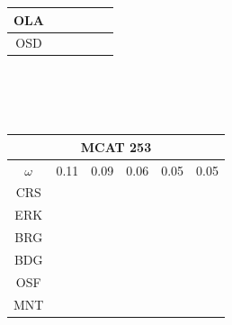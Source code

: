 \documentclass[12pt]{article}
\begin{document}
\begin{landscape}
\begin{figure}
{\begin{minipage}[c]{0.3\textwidth}
\begin{tabular}{|c|c|c|c|c|c|}
        OLA&\cellcolor[HTML]{984EA3}&\cellcolor[HTML]{4DAF4A}&\cellcolor[HTML]{984EA3}&\cellcolor[HTML]{984EA3}&\cellcolor[HTML]{984EA3}\\ \hline %
        OSD&\cellcolor[HTML]{FF7F00}&\cellcolor[HTML]{984EA3}&\cellcolor[HTML]{FF7F00}&\cellcolor[HTML]{FF7F00}&\cellcolor[HTML]{FF7F00}\\ \hline %
\end{tabular}\\$~$\\$~$\\
\hspace*{-5cm}
\begin{tabular}{|c|c|c|c|c|c|}%
         \hline \multicolumn{6}{|c|}{MCAT 253} \\ \hline
         $\omega$&0.11&0.09&0.06&0.05&0.05\\ \hline %
        CRS&\cellcolor[HTML]{E41A1C}&\cellcolor[HTML]{E41A1C}&\cellcolor[HTML]{E41A1C}&\cellcolor[HTML]{E41A1C}&\cellcolor[HTML]{E41A1C}\\ \hline %
        ERK&\cellcolor[HTML]{E41A1C}&\cellcolor[HTML]{E41A1C}&\cellcolor[HTML]{E41A1C}&\cellcolor[HTML]{377EB8}&\cellcolor[HTML]{E41A1C}\\ \hline %
        BRG&\cellcolor[HTML]{E41A1C}&\cellcolor[HTML]{377EB8}&\cellcolor[HTML]{E41A1C}&\cellcolor[HTML]{377EB8}&\cellcolor[HTML]{377EB8}\\ \hline %
        BDG&\cellcolor[HTML]{377EB8}&\cellcolor[HTML]{377EB8}&\cellcolor[HTML]{377EB8}&\cellcolor[HTML]{4DAF4A}&\cellcolor[HTML]{4DAF4A}\\ \hline %
        OSF&\cellcolor[HTML]{377EB8}&\cellcolor[HTML]{377EB8}&\cellcolor[HTML]{377EB8}&\cellcolor[HTML]{4DAF4A}&\cellcolor[HTML]{4DAF4A}\\ \hline %
        MNT&\cellcolor[HTML]{4DAF4A}&\cellcolor[HTML]{4DAF4A}&\cellcolor[HTML]{4DAF4A}&\cellcolor[HTML]{984EA3}&\cellcolor[HTML]{984EA3}\\ \hline %

\end{tabular}
\end{minipage}}
\end{figure}
\end{landscape}
\end{document}
